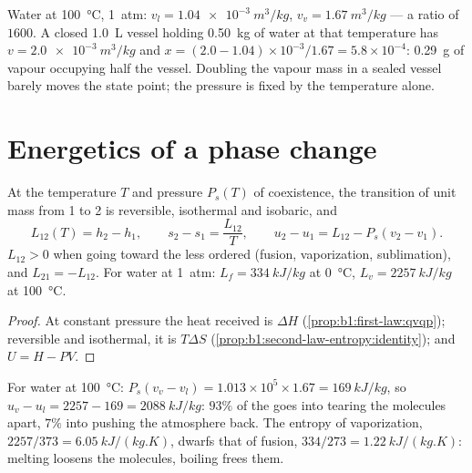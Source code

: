 \begin{example}\label{ex:b1:phase-changes:lever}
Water at \qty{100}{\degreeCelsius}, \qty{1}{atm}: $v_l = \qty{1.04e-3}{m^3/kg}$,
$v_v = \qty{1.67}{m^3/kg}$ --- a ratio of $1600$. A closed \qty{1.0}{L}
vessel holding \qty{0.50}{kg} of water at that temperature has $v =
\qty{2.0e-3}{m^3/kg}$ and $x = (2.0 - 1.04) \times 10^{-3}/1.67 = 5.8 \times 10^{-4}$:
\qty{0.29}{g} of vapour occupying half the vessel. Doubling the vapour
mass in a sealed vessel barely moves the state point; the pressure is
fixed by the temperature alone.
\end{example}

\section{Energetics of a phase change}

\begin{proposition}\label{prop:b1:phase-changes:latent}
At the temperature $T$ and pressure $P_s(T)$ of coexistence, the
transition of unit mass from  1 to  2 is reversible,
isothermal and isobaric, and
\[
L_{12}(T) = h_2 - h_1 , \qquad s_2 - s_1 = \frac{L_{12}}{T} , \qquad
u_2 - u_1 = L_{12} - P_s(v_2 - v_1) .
\]
$L_{12} > 0$ when going toward the less ordered  (fusion,
vaporization, sublimation), and $L_{21} = -L_{12}$. For water at \qty{1}{atm}:
$L_f = \qty{334}{kJ/kg}$ at \qty{0}{\degreeCelsius}, $L_v = \qty{2257}{kJ/kg}$ at
\qty{100}{\degreeCelsius}.
\end{proposition}

\begin{proof}
At constant pressure the heat received is $\Delta H$
(\cref{prop:b1:first-law:qvqp}); reversible and isothermal, it is
$T\Delta S$ (\cref{prop:b1:second-law-entropy:identity}); and $U = H - PV$.
\end{proof}

\begin{example}\label{ex:b1:phase-changes:whereheat}
For water at \qty{100}{\degreeCelsius}: $P_s(v_v - v_l) = 1.013 \times 10^5 \times
1.67 = \qty{169}{kJ/kg}$, so $u_v - u_l = 2257 - 169 = \qty{2088}{kJ/kg}$:
$93\%$ of the  goes into tearing the molecules apart, $7\%$
into pushing the atmosphere back. The entropy of vaporization,
$2257/373 = \qty{6.05}{kJ/(kg.K)}$, dwarfs that of fusion, $334/273 =
\qty{1.22}{kJ/(kg.K)}$: melting loosens the molecules, boiling frees them.
\end{example}


